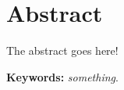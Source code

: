 \chapter{Abstract}
    \thispagestyle{empty}

    The abstract goes here!

    \textbf{Keywords:} \textit{something}.
